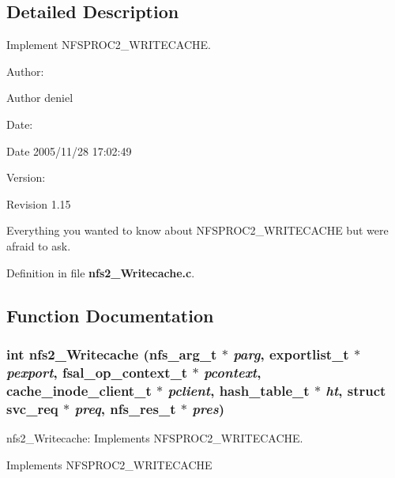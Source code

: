 \subsection{Detailed Description}
Implement NFSPROC2\_\-WRITECACHE. 

\begin{Desc}
\item[Author:]\end{Desc}
\begin{Desc}
\item[Author]deniel \end{Desc}
\begin{Desc}
\item[Date:]\end{Desc}
\begin{Desc}
\item[Date]2005/11/28 17:02:49 \end{Desc}
\begin{Desc}
\item[Version:]\end{Desc}
\begin{Desc}
\item[Revision]1.15 \end{Desc}
Everything you wanted to know about NFSPROC2\_\-WRITECACHE but were afraid to ask. 

Definition in file {\bf nfs2\_\-Writecache.c}.

\subsection{Function Documentation}
\subsubsection[{nfs2\_\-Writecache}]{\setlength{\rightskip}{0pt plus 5cm}int nfs2\_\-Writecache (nfs\_\-arg\_\-t $\ast$ {\em parg}, \/  exportlist\_\-t $\ast$ {\em pexport}, \/  fsal\_\-op\_\-context\_\-t $\ast$ {\em pcontext}, \/  cache\_\-inode\_\-client\_\-t $\ast$ {\em pclient}, \/  hash\_\-table\_\-t $\ast$ {\em ht}, \/  struct svc\_\-req $\ast$ {\em preq}, \/  nfs\_\-res\_\-t $\ast$ {\em pres})}\label{nfs2__Writecache_8c_bacd66182d35baed787722006f1f21b1}


nfs2\_\-Writecache: Implements NFSPROC2\_\-WRITECACHE.

Implements NFSPROC2\_\-WRITECACHE

